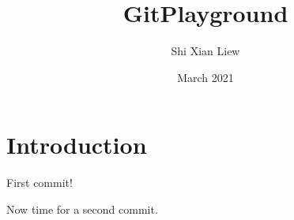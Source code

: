 \documentclass{article}
\title{GitPlayground}
\author{Shi Xian Liew}
\date{March 2021}
\begin{document}
\maketitle

\section{Introduction}
First commit!


Now time for a second commit.
\end{document}
